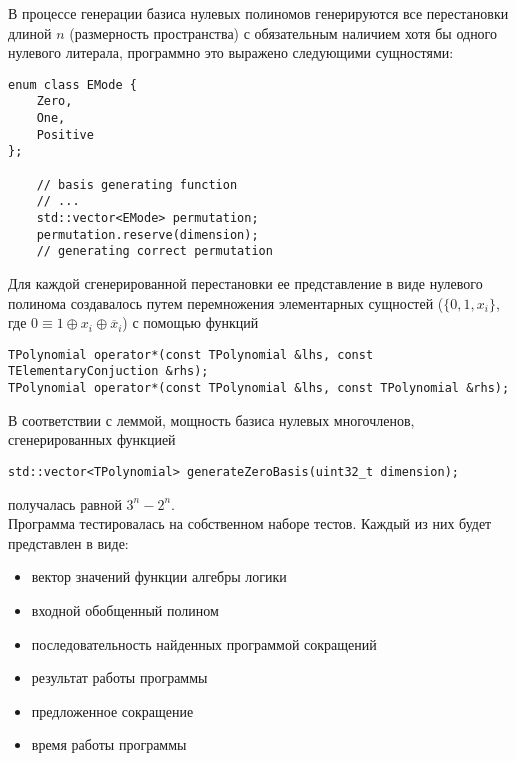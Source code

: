 \documentclass[a4paper,12pt,titlepage,finall]{article}
\begin{document}
В процессе генерации базиса нулевых полиномов генерируются все перестановки длиной $n$ (размерность пространства) с обязательным наличием хотя бы одного нулевого литерала, программно это выражено следующими сущностями:
\begin{lstlisting}
enum class EMode {
    Zero,
    One,
    Positive
};

    // basis generating function
    // ...
    std::vector<EMode> permutation;
    permutation.reserve(dimension);
    // generating correct permutation
\end{lstlisting}
Для каждой сгенерированной перестановки ее представление в виде нулевого полинома создавалось путем перемножения элементарных сущностей ($\{0, 1, x_i \}$, где $0 \equiv 1 \oplus x_i \oplus \overline x_i$) с помощью функций
\begin{lstlisting}
TPolynomial operator*(const TPolynomial &lhs, const TElementaryConjuction &rhs);
TPolynomial operator*(const TPolynomial &lhs, const TPolynomial &rhs);
\end{lstlisting}
В соответствии с леммой, мощность базиса нулевых многочленов, сгенерированных функцией
\begin{lstlisting}
std::vector<TPolynomial> generateZeroBasis(uint32_t dimension);
\end{lstlisting}
получалась равной $3^n - 2^n$.\\

Программа тестировалась на собственном наборе тестов.
Каждый из них будет представлен в виде:
\begin{itemize}
    \item вектор значений функции алгебры логики
    \item входной обобщенный полином
    \item последовательность найденных программой сокращений
    \item результат работы программы
    \item предложенное сокращение
    \item время работы программы
\end{itemize}
\end{document}
